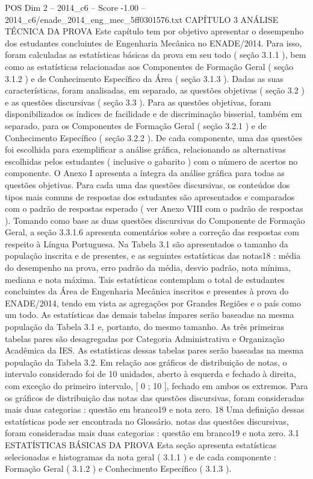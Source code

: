 \begin{textsample}{POS Dim 2 – 2014\_c6 – Score -1.00 – 2014\_c6/enade\_2014\_eng\_mec\_5ff0301576.txt}  \label{ex:f2_pos_232}
CAPÍTULO 3 ANÁLISE TÉCNICA DA PROVA Este capítulo tem por objetivo apresentar o desempenho dos estudantes concluintes de Engenharia Mecânica no ENADE/2014.
Para isso, foram calculadas as estatísticas básicas da prova em seu todo ( seção 3.1.1 ), bem como as estatísticas relacionadas aos Componentes de Formação Geral ( seção 3.1.2 ) e de Conhecimento Específico da Área ( seção 3.1.3 ).
Dadas as suas características, foram analisadas, em separado, as questões objetivas ( seção 3.2 ) e as questões discursivas ( seção 3.3 ).
Para as questões objetivas, foram disponibilizados os índices de facilidade e de discriminação bisserial, também em separado, para os Componentes de Formação Geral ( seção 3.2.1 ) e de Conhecimento Específico ( seção 3.2.2 ).
De cada componente, uma das questões foi escolhida para exemplificar a análise gráfica, relacionando as alternativas escolhidas pelos estudantes ( inclusive o gabarito ) com o número de acertos no componente.
O Anexo I apresenta a íntegra da análise gráfica para todas as questões objetivas.
Para cada uma das questões discursivas, os conteúdos dos tipos mais comuns de respostas dos estudantes são apresentados e comparados com o padrão de respostas esperado ( ver Anexo VIII com o padrão de respostas ).
Tomando como base as duas questões discursivas do Componente de Formação Geral, a seção 3.3.1.6 apresenta comentários sobre a correção das respostas com respeito à Língua Portuguesa.
Na Tabela 3.1 são apresentados o tamanho da população inscrita e de presentes, e as seguintes estatísticas das notas18 : média do desempenho na prova, erro padrão da média, desvio padrão, nota mínima, mediana e nota máxima.
Tais estatísticas contemplam o total de estudantes concluintes da Área de Engenharia Mecânica inscritos e presentes à prova do ENADE/2014, tendo em vista as agregações por Grandes Regiões e o país como um todo.
As estatísticas das demais tabelas ímpares serão baseadas na mesma população da Tabela 3.1 e, portanto, do mesmo tamanho.
As três primeiras tabelas pares são desagregadas por Categoria Administrativa e Organização Acadêmica da IES.
As estatísticas dessas tabelas pares serão baseadas na mesma população da Tabela 3.2.
Em relação aos gráficos de distribuição de notas, o intervalo considerado foi de 10 unidades, aberto à esquerda e fechado à direita, com exceção do primeiro intervalo, [ 0 ; 10 ], fechado em ambos os extremos.
Para os gráficos de distribuição das notas das questões discursivas, foram consideradas mais duas categorias : questão em branco19 e nota zero. 18 Uma definição dessas estatísticas pode ser encontrada no Glossário. notas das questões discursivas, foram consideradas mais duas categorias : questão em branco19 e nota zero. 3.1 ESTATÍSTICAS BÁSICAS DA PROVA Esta seção apresenta estatísticas selecionadas e histogramas da nota geral ( 3.1.1 ) e de cada componente : Formação Geral ( 3.1.2 ) e Conhecimento Específico ( 3.1.3 ).

\end{textsample}
